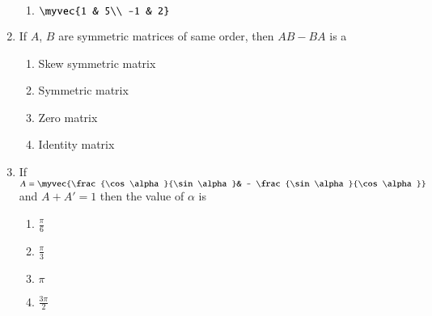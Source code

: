\documentclass{article}
\theoremstyle{remark}
\begin{document}
\begin{enumerate}
\begin{enumerate}[label=(\roman*)]
\item $\myvec{1 & 5\\ -1 & 2}$
\end{enumerate}
\item If $A$, $B$ are symmetric matrices of same order, then $AB-BA$ is a
\begin{enumerate}
\item Skew symmetric matrix
\item Symmetric matrix
\item Zero matrix
\item Identity matrix
\end{enumerate}
\item If $A=\myvec{\frac {\cos \alpha}{\sin \alpha}& - \frac{\sin \alpha}{\cos \alpha}}$ and $A+A'=1$ then the value of $\alpha$ is
\begin{enumerate}
\item $\frac{\pi}{6}$
\item $\frac{\pi}{3}$
\item $\pi$
\item $\frac{3\pi}{2}$
\end{enumerate}  
\end{enumerate}
\end{document}
